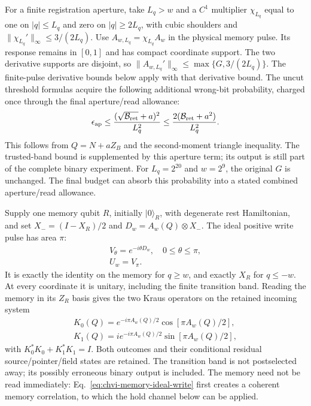 For a finite registration aperture, take $L_q>w$ and a $C^1$ multiplier
$\chi_{L_q}$ equal to one on $|q|\leq L_q$ and zero on
$|q|\geq2L_q$, with cubic shoulders and
$\|\chi_{L_q}'\|_\infty\leq3/(2L_q)$.
Use $A_{w,L_q}=\chi_{L_q}A_w$ in the physical memory pulse.
Its response remains in $[0,1]$ and has compact coordinate support.
The two derivative supports are disjoint, so
$\|A_{w,L_q}'\|_\infty\leq\max\{G,3/(2L_q)\}$.
The finite-pulse derivative bounds below apply with that derivative bound.
The uncut threshold formulas acquire the following additional wrong-bit
probability, charged once through the final aperture/read allowance:
\begin{equation}
 \epsilon_{\rm ap}\leq
 \frac{(\sqrt{\mathcal B_{\rm ret}}+a)^2}{L_q^2}
 \leq\frac{2(\mathcal B_{\rm ret}+a^2)}{L_q^2}.
 \label{eq:chvi-memory-aperture}
\end{equation}
This follows from $Q=N+aZ_B$ and the second-moment triangle inequality.
The trusted-band bound is supplemented by this aperture term; its output
is still part of the complete binary experiment. For $L_q=2^{20}$ and
$w=2^9$, the original $G$ is unchanged. The final budget can absorb this
probability into a stated combined aperture/read allowance.

Supply one memory qubit $R$, initially $|0\rangle_R$, with degenerate
rest Hamiltonian, and set $X_-=(I-X_R)/2$ and
$D_w=A_w(Q)\otimes X_-$. The ideal positive write pulse has area $\pi$:
\begin{equation}
\begin{gathered}
V_\theta=e^{-i\theta D_w},\quad 0\leq\theta\leq\pi,
 \\
 U_w=V_\pi.
\end{gathered}
\label{eq:chvi-memory-ideal-write}
\end{equation}
It is exactly the identity on the memory for $q\geq w$, and exactly
$X_R$ for $q\leq-w$. At every coordinate it is unitary, including the
finite transition band. Reading the memory in its $Z_R$ basis gives the
two Kraus operators on the retained incoming system
\begin{equation}
\begin{gathered}
K_0(Q)=e^{-i\pi A_w(Q)/2}\cos[\pi A_w(Q)/2],\\
 K_1(Q)=i e^{-i\pi A_w(Q)/2}\sin[\pi A_w(Q)/2],
\end{gathered}
\label{eq:chvi-memory-kraus}
\end{equation}
with $K_0^*K_0+K_1^*K_1=I$. Both outcomes and their conditional residual
source/pointer/field states are retained. The transition band is not
postselected away; its possibly erroneous binary output is included.
The memory need not be read immediately: Eq.~\eqref{eq:chvi-memory-ideal-write}
first creates a coherent memory correlation, to which the hold channel
below can be applied.

